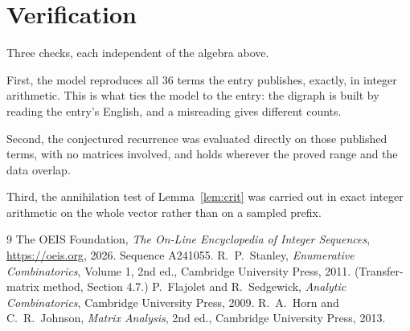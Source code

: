 \documentclass[11pt,a4paper]{article}
\theoremstyle{plain}
\theoremstyle{definition}
\begin{document}
\section{Verification}

Three checks, each independent of the algebra above.

First, the model reproduces all $36$ terms the entry publishes, exactly, in integer
arithmetic. This is what ties the model to the entry: the digraph is built by reading the
entry's English, and a misreading gives different counts.

Second, the conjectured recurrence was evaluated directly on those published terms, with no
matrices involved, and holds wherever the proved range and the data overlap.

Third, the annihilation test of Lemma~\ref{lem:crit} was carried out in exact integer
arithmetic on the whole vector rather than on a sampled prefix.

\begin{thebibliography}{9}
 The OEIS Foundation, \emph{The On-Line Encyclopedia of Integer
Sequences}, \url{https://oeis.org}, 2026. Sequence A241055.
 R.~P.~Stanley, \emph{Enumerative Combinatorics}, Volume 1, 2nd ed.,
Cambridge University Press, 2011. (Transfer-matrix method, Section 4.7.)
 P.~Flajolet and R.~Sedgewick, \emph{Analytic Combinatorics}, Cambridge
University Press, 2009.
 R.~A.~Horn and C.~R.~Johnson, \emph{Matrix Analysis}, 2nd ed., Cambridge
University Press, 2013.
\end{thebibliography}
\end{document}
